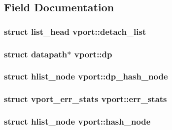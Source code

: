 \subsection{Field Documentation}
\hypertarget{structvport_ae41f659d10b0f1c27324e9406d5c2ef1}{}
\subsubsection[{detach\+\_\+list}]{\setlength{\rightskip}{0pt plus 5cm}struct list\+\_\+head vport\+::detach\+\_\+list}\label{structvport_ae41f659d10b0f1c27324e9406d5c2ef1}
\hypertarget{structvport_a49fb6f6bf0ac4337853e9242e88ddc42}{}
\subsubsection[{dp}]{\setlength{\rightskip}{0pt plus 5cm}struct {\bf datapath}$\ast$ vport\+::dp}\label{structvport_a49fb6f6bf0ac4337853e9242e88ddc42}
\hypertarget{structvport_a27d2c94e2edd5de172e0b866cdd70fea}{}
\subsubsection[{dp\+\_\+hash\+\_\+node}]{\setlength{\rightskip}{0pt plus 5cm}struct hlist\+\_\+node vport\+::dp\+\_\+hash\+\_\+node}\label{structvport_a27d2c94e2edd5de172e0b866cdd70fea}
\hypertarget{structvport_a5cd8a50cb02833a868db549d64052c99}{}
\subsubsection[{err\+\_\+stats}]{\setlength{\rightskip}{0pt plus 5cm}struct {\bf vport\+\_\+err\+\_\+stats} vport\+::err\+\_\+stats}\label{structvport_a5cd8a50cb02833a868db549d64052c99}
\hypertarget{structvport_ae6324a0c2483c3d1600cb29a6f4bcb8d}{}
\subsubsection[{hash\+\_\+node}]{\setlength{\rightskip}{0pt plus 5cm}struct hlist\+\_\+node vport\+::hash\+\_\+node}\label{structvport_ae6324a0c2483c3d1600cb29a6f4bcb8d}
\hypertarget{structvport_a5af933fc664c1194ac3bbc337da35586}{}
